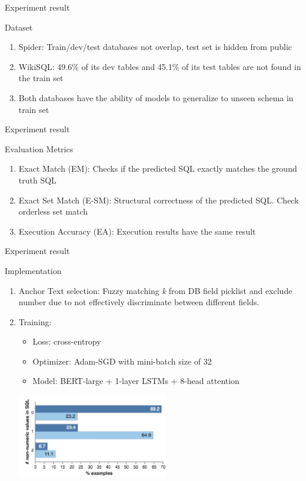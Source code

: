 \documentclass{beamer}
\begin{document}
\begin{frame}[t]{Experiment result}\vspace{10pt}
\begin{block}{Dataset}
\begin{enumerate}
\item Spider: Train/dev/test databases not overlap, test set is hidden from public
\item WikiSQL: 49.6\% of its dev tables and 45.1\% of its test tables are not found in the train set
\item Both databases have the ability of models to generalize to unseen schema in train set
\end{enumerate}
\end{block}
\end{frame}

\begin{frame}[t]{Experiment result}\vspace{10pt}
\begin{block}{Evaluation Metrics}
\begin{enumerate}
\item Exact Match (EM): Checks if the predicted SQL exactly matches the ground truth SQL
\item Exact Set Match (E-SM): Structural correctness of the predicted SQL. Check orderless set match
\item Execution Accuracy (EA): Execution results have the same result
\end{enumerate}
\end{block}
\end{frame}

\begin{frame}[t]{Experiment result}\vspace{10pt}
\begin{block}{Implementation}
\begin{enumerate}
\item Anchor Text selection: Fuzzy matching \emph{k} from DB field picklist and exclude number due to not effectively discriminate between different fields. 
\item Training: 
\begin{itemize}
\item Loss: cross-entropy
\item Optimizer: Adam-SGD with mini-batch size of 32
\item Model: BERT-large + 1-layer LSTMs + 8-head attention
\end{itemize}
\includegraphics{non-numeric}
\end{enumerate}
\end{block}
\end{frame}
\end{document}
